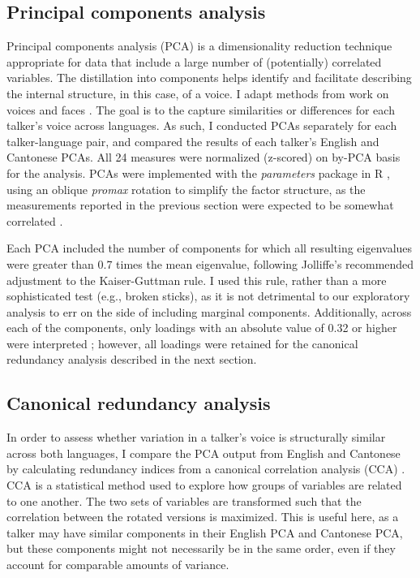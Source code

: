 \subsection{Principal components analysis}\label{ch3:sec:pca}

Principal components analysis (PCA) is a dimensionality reduction technique appropriate for data that include a large number of (potentially) correlated variables. The distillation into components helps identify and facilitate describing the internal structure, in this case, of a voice. I adapt methods from work on voices \citep{lee_2019_acoustic-paper} and faces \citep{burton_2016_faces,turk_1991_eigenfaces}. The goal is to the capture similarities or differences for each talker's voice across languages. As such, I conducted PCAs separately for each talker-language pair, and compared the results of each talker's English and Cantonese PCAs. All 24 measures were normalized (z-scored) on by-PCA basis for the analysis. PCAs were implemented with the \textit{parameters} package \citep{makowski_2019_parameters} in R \citep{r_2021}, using an oblique \textit{promax} rotation to simplify the factor structure, as the measurements reported in the previous section were expected to be somewhat correlated \citep{lee_2019_acoustic-paper}.

Each PCA included the number of components for which all resulting eigenvalues were greater than 0.7 times the mean eigenvalue, following Jolliffe's \citep{jolliffe_2002_pca} recommended adjustment to the Kaiser-Guttman rule. I used this rule, rather than a more sophisticated test (e.g., broken sticks), as it is not detrimental to our exploratory analysis to err on the side of including marginal components. Additionally, across each of the components, only loadings with an absolute value of 0.32 or higher were interpreted \citep{lee_2019_acoustic-paper,tabachnick_2013_statistics}; however, all loadings were retained for the canonical redundancy analysis described in the next section.

\subsection{Canonical redundancy analysis}

In order to assess whether variation in a talker's voice is structurally similar across both languages, I compare the PCA output from English and Cantonese by calculating redundancy indices from a canonical correlation analysis (CCA) \citep{stewart_1968_canonical,jolliffe_2002_pca}. CCA is a statistical method used to explore how groups of variables are related to one another. The two sets of variables are transformed such that the correlation between the rotated versions is maximized. This is useful here, as a talker may have similar components in their English PCA and Cantonese PCA, but these components might not necessarily be in the same order, even if they account for comparable amounts of variance. 

